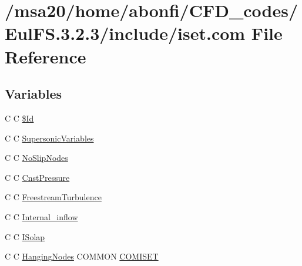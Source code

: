 \hypertarget{msa20_2home_2abonfi_2_c_f_d__codes_2_eul_f_s_83_82_83_2include_2iset_8com}{\section{/msa20/home/abonfi/\-C\-F\-D\-\_\-codes/\-Eul\-F\-S.3.2.3/include/iset.com File Reference}
\label{msa20_2home_2abonfi_2_c_f_d__codes_2_eul_f_s_83_82_83_2include_2iset_8com}
}
\subsection*{Variables}
\begin{DoxyCompactItemize}
\item 
C C \hyperlink{msa20_2home_2abonfi_2_c_f_d__codes_2_eul_f_s_83_82_83_2include_2iset_8com_af40bd3a96fc1553c00422342f92046b8}{\$\-Id}
\item 
C C \hyperlink{msa20_2home_2abonfi_2_c_f_d__codes_2_eul_f_s_83_82_83_2include_2iset_8com_a9c554f5a269e13d0fc42881eee35b577}{Supersonic\-Variables}
\item 
C C \hyperlink{msa20_2home_2abonfi_2_c_f_d__codes_2_eul_f_s_83_82_83_2include_2iset_8com_a3ceb88c3d1d9785f38fbf3e9cb4fdd96}{No\-Slip\-Nodes}
\item 
C C \hyperlink{msa20_2home_2abonfi_2_c_f_d__codes_2_eul_f_s_83_82_83_2include_2iset_8com_af22dc1422690094d916c831fac3aad56}{Cnst\-Pressure}
\item 
C C \hyperlink{msa20_2home_2abonfi_2_c_f_d__codes_2_eul_f_s_83_82_83_2include_2iset_8com_a671b39d0fafccefc1885d7254c1336c3}{Freestream\-Turbulence}
\item 
C C \hyperlink{msa20_2home_2abonfi_2_c_f_d__codes_2_eul_f_s_83_82_83_2include_2iset_8com_a90168b11d698ecb52b7734080cf69c6e}{Internal\-\_\-inflow}
\item 
C C \hyperlink{msa20_2home_2abonfi_2_c_f_d__codes_2_eul_f_s_83_82_83_2include_2iset_8com_abc61d71b324facca4225b71ae99818a2}{I\-Solap}
\item 
C C \hyperlink{home_2abonfi_2_c_f_d__codes_2_eul_f_s_83_84_2include_2iset_8com_ab153707b02904676033ef6493c94bdee}{Hanging\-Nodes} C\-O\-M\-M\-O\-N \hyperlink{msa20_2home_2abonfi_2_c_f_d__codes_2_eul_f_s_83_82_83_2include_2iset_8com_aebc87732e3ac14d780e3b17c12ba34fd}{C\-O\-M\-I\-S\-E\-T}
\end{DoxyCompactItemize}


